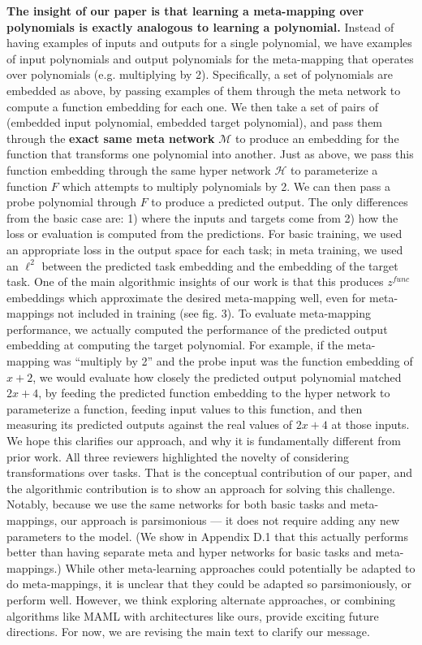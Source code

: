 \documentclass{article}
\begin{document}
\textbf{The insight of our paper is that learning a meta-mapping over polynomials is exactly analogous to learning a polynomial.} Instead of having examples of inputs and outputs for a single polynomial, we have examples of input polynomials and output polynomials for the meta-mapping that operates over polynomials (e.g. multiplying by 2). Specifically, a set of polynomials are embedded as above, by passing examples of them through the meta network to compute a function embedding for each one. We then take a set of pairs of (embedded input polynomial, embedded target polynomial), and pass them through the \textbf{exact same meta network} $\mathcal{M}$ to produce an embedding for the function that transforms one polynomial into another. Just as above, we pass this function embedding through the same hyper network $\mathcal{H}$ to parameterize a function $F$ which attempts to multiply polynomials by 2. We can then pass a probe polynomial through $F$ to produce a predicted output. The only differences from the basic case are: 1) where the inputs and targets come from 2) how the loss or evaluation is computed from the predictions. For basic training, we used an appropriate loss in the output space for each task; in meta training, we used an $\ell^2$ between the predicted task embedding and the embedding of the target task. One of the main algorithmic insights of our work is that this produces $z^{func}$ embeddings which approximate the desired meta-mapping well, even for meta-mappings not included in training (see fig. 3). To evaluate meta-mapping performance, we actually computed the performance of the predicted output embedding at computing the target polynomial. For example, if the meta-mapping was ``multiply by 2'' and the probe input was the function embedding of $x + 2$, we would evaluate how closely the predicted output polynomial matched $2x + 4$, by feeding the predicted function embedding to the hyper network to parameterize a function, feeding input values to this function, and then measuring its predicted outputs against the real values of $2x+4$ at those inputs. We hope this clarifies our approach, and why it is fundamentally different from prior work. All three reviewers highlighted the novelty of considering transformations over tasks. That is the conceptual contribution of our paper, and the algorithmic contribution is to show an approach for solving this challenge. Notably, because we use the same networks for both basic tasks and meta-mappings, our approach is parsimonious --- it does not require adding any new parameters to the model. (We show in Appendix D.1 that this actually performs better than having separate meta and hyper networks for basic tasks and meta-mappings.) While other meta-learning approaches could potentially be adapted to do meta-mappings, it is unclear that they could be adapted so parsimoniously, or perform well. However, we think exploring alternate approaches, or combining algorithms like MAML with architectures like ours, provide exciting future directions. For now, we are revising the main text to clarify our message. \par 
\end{document}
